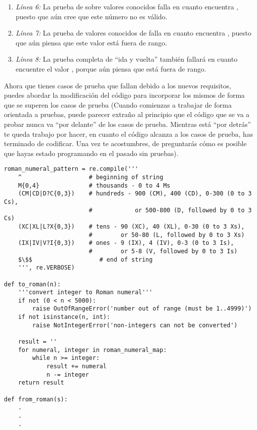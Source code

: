 \begin{enumerate}

\item \emph{Línea 6:} La prueba de  sobre valores conocidos falla en cuanto encuentra , puesto que  aún cree que este número no es válido.

\item \emph{Línea 7:} La prueba de valores conocidos de  falla en cuanto encuentra , puesto que  aún piensa que este valor está fuera de rango.

\item \emph{Línea 8:}  La prueba completa de ``ida y vuelta'' también fallará en cuanto encuentre el valor , porque  aún piensa que está fuera de rango.

\end{enumerate}

Ahora que tienes casos de prueba que fallan debido a los nuevos requisitos, puedes abordar la modificación del código para incorporar los mismos de forma que se superen los casos de prueba (Cuando comienzas a trabajar de forma orientada a pruebas, puede parecer extraño al principio que el código que se va a probar nunca va ``por delante'' de los casos de prueba. Mientras está ``por detrás'' te queda trabajo por hacer, en cuanto el código alcanza a los casos de prueba, has terminado de codificar. Una vez te acostumbres, de preguntarás cómo es posible que hayas estado programando en el pasado sin pruebas).

\noindent\begin{minipage}{\textwidth}
\begin{lstlisting}[mathescape=True]
roman_numeral_pattern = re.compile('''
    ^                   # beginning of string
    M{0,4}              # thousands - 0 to 4 Ms
    (CM|CD|D?C{0,3})    # hundreds - 900 (CM), 400 (CD), 0-300 (0 to 3 Cs),
                        #            or 500-800 (D, followed by 0 to 3 Cs)
    (XC|XL|L?X{0,3})    # tens - 90 (XC), 40 (XL), 0-30 (0 to 3 Xs),
                        #        or 50-80 (L, followed by 0 to 3 Xs)
    (IX|IV|V?I{0,3})    # ones - 9 (IX), 4 (IV), 0-3 (0 to 3 Is),
                        #        or 5-8 (V, followed by 0 to 3 Is)
    $\$$                   # end of string
    ''', re.VERBOSE)

def to_roman(n):
    '''convert integer to Roman numeral'''
    if not (0 < n < 5000):
        raise OutOfRangeError('number out of range (must be 1..4999)')
    if not isinstance(n, int):
        raise NotIntegerError('non-integers can not be converted')

    result = ''
    for numeral, integer in roman_numeral_map:
        while n >= integer:
            result += numeral
            n -= integer
    return result

def from_roman(s):
    .
    .
    .
\end{lstlisting}
\end{minipage}

